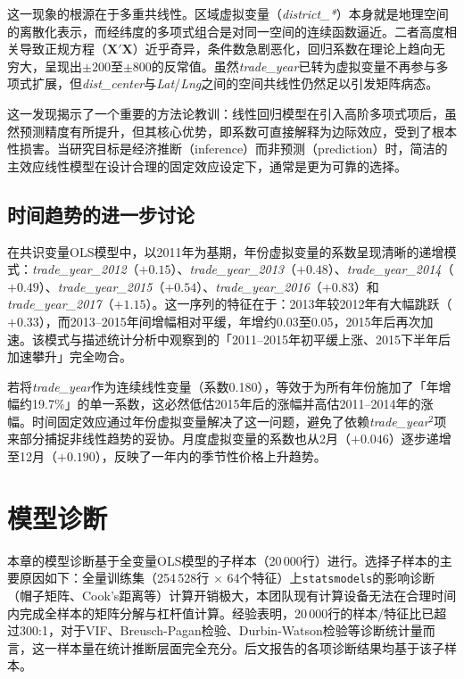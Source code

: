 \documentclass[12pt,a4paper]{ctexart}
\begin{document}
这一现象的根源在于多重共线性。区域虚拟变量（\textit{district\_*}）本身就是地理空间的离散化表示，而经纬度的多项式组合是对同一空间的连续函数逼近。二者高度相关导致正规方程（$\bm{X}'\bm{X}$）近乎奇异，条件数急剧恶化，回归系数在理论上趋向无穷大，呈现出$\pm200$至$\pm800$的反常值。虽然\textit{trade\_year}已转为虚拟变量不再参与多项式扩展，但\textit{dist\_center}与\textit{Lat}/\textit{Lng}之间的空间共线性仍然足以引发矩阵病态。

这一发现揭示了一个重要的方法论教训：线性回归模型在引入高阶多项式项后，虽然预测精度有所提升，但其核心优势，即系数可直接解释为边际效应，受到了根本性损害。当研究目标是经济推断（inference）而非预测（prediction）时，简洁的主效应线性模型在设计合理的固定效应设定下，通常是更为可靠的选择。

\subsection{时间趋势的进一步讨论}

在共识变量OLS模型中，以2011年为基期，年份虚拟变量的系数呈现清晰的递增模式：\textit{trade\_year\_2012}（$+0.15$）、\textit{trade\_year\_2013}（$+0.48$）、\textit{trade\_year\_2014}（$+0.49$）、\textit{trade\_year\_2015}（$+0.54$）、\textit{trade\_year\_2016}（$+0.83$）和\textit{trade\_year\_2017}（$+1.15$）。这一序列的特征在于：2013年较2012年有大幅跳跃（$+0.33$），而2013--2015年间增幅相对平缓，年增约0.03至0.05，2015年后再次加速。该模式与描述统计分析中观察到的「2011--2015年初平缓上涨、2015下半年后加速攀升」完全吻合。

若将\textit{trade\_year}作为连续线性变量（系数0.180），等效于为所有年份施加了「年增幅约19.7\%」的单一系数，这必然低估2015年后的涨幅并高估2011--2014年的涨幅。时间固定效应通过年份虚拟变量解决了这一问题，避免了依赖\textit{trade\_year}$^{2}$项来部分捕捉非线性趋势的妥协。月度虚拟变量的系数也从2月（$+0.046$）逐步递增至12月（$+0.190$），反映了一年内的季节性价格上升趋势。

\section{模型诊断}

本章的模型诊断基于全变量OLS模型的子样本（20\,000行）进行。选择子样本的主要原因如下：全量训练集（254\,528行 $\times$ 64个特征）上\texttt{statsmodels}的影响诊断（帽子矩阵、Cook's距离等）计算开销极大，本团队现有计算设备无法在合理时间内完成全样本的矩阵分解与杠杆值计算。经验表明，20\,000行的样本/特征比已超过300:1，对于VIF、Breusch-Pagan检验、Durbin-Watson检验等诊断统计量而言，这一样本量在统计推断层面完全充分。后文报告的各项诊断结果均基于该子样本。
\end{document}
